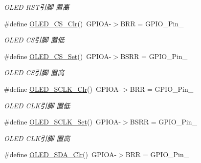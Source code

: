 \begin{DoxyCompactItemize}
\begin{DoxyCompactList}\small\item\em \-O\-L\-E\-D \-R\-S\-T引脚 置高 \end{DoxyCompactList}\item 
\hypertarget{group___o_l_e_d_gad80d54768e18f0c9b69b67151b3a6a60}{\#define \hyperlink{group___o_l_e_d_gad80d54768e18f0c9b69b67151b3a6a60}{\-O\-L\-E\-D\-\_\-\-C\-S\-\_\-\-Clr}()~\-G\-P\-I\-O\-A-\/$>$\-B\-R\-R = \-G\-P\-I\-O\-\_\-\-Pin\-\_}\label{group___o_l_e_d_gad80d54768e18f0c9b69b67151b3a6a60}

\begin{DoxyCompactList}\small\item\em \-O\-L\-E\-D \-C\-S引脚 置低 \end{DoxyCompactList}\item 
\hypertarget{group___o_l_e_d_gabbefb2479ce47e659b0b6753c695525b}{\#define \hyperlink{group___o_l_e_d_gabbefb2479ce47e659b0b6753c695525b}{\-O\-L\-E\-D\-\_\-\-C\-S\-\_\-\-Set}()~\-G\-P\-I\-O\-A-\/$>$\-B\-S\-R\-R = \-G\-P\-I\-O\-\_\-\-Pin\-\_}\label{group___o_l_e_d_gabbefb2479ce47e659b0b6753c695525b}

\begin{DoxyCompactList}\small\item\em \-O\-L\-E\-D \-C\-S引脚 置高 \end{DoxyCompactList}\item 
\hypertarget{group___o_l_e_d_ga330cdac534159246b914bc977b9ff662}{\#define \hyperlink{group___o_l_e_d_ga330cdac534159246b914bc977b9ff662}{\-O\-L\-E\-D\-\_\-\-S\-C\-L\-K\-\_\-\-Clr}()~\-G\-P\-I\-O\-A-\/$>$\-B\-R\-R = \-G\-P\-I\-O\-\_\-\-Pin\-\_}\label{group___o_l_e_d_ga330cdac534159246b914bc977b9ff662}

\begin{DoxyCompactList}\small\item\em \-O\-L\-E\-D \-C\-L\-K引脚 置低 \end{DoxyCompactList}\item 
\hypertarget{group___o_l_e_d_ga7ca04d572106ca826c92614d108b84f9}{\#define \hyperlink{group___o_l_e_d_ga7ca04d572106ca826c92614d108b84f9}{\-O\-L\-E\-D\-\_\-\-S\-C\-L\-K\-\_\-\-Set}()~\-G\-P\-I\-O\-A-\/$>$\-B\-S\-R\-R = \-G\-P\-I\-O\-\_\-\-Pin\-\_}\label{group___o_l_e_d_ga7ca04d572106ca826c92614d108b84f9}

\begin{DoxyCompactList}\small\item\em \-O\-L\-E\-D \-C\-L\-K引脚 置高 \end{DoxyCompactList}\item 
\hypertarget{group___o_l_e_d_ga588d57ee0a3d08b4170da345fc132ea6}{\#define \hyperlink{group___o_l_e_d_ga588d57ee0a3d08b4170da345fc132ea6}{\-O\-L\-E\-D\-\_\-\-S\-D\-A\-\_\-\-Clr}()~\-G\-P\-I\-O\-A-\/$>$\-B\-R\-R = \-G\-P\-I\-O\-\_\-\-Pin\-\_}\label{group___o_l_e_d_ga588d57ee0a3d08b4170da345fc132ea6}


\end{DoxyCompactItemize}
